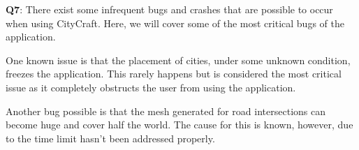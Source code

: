 \textbf{Q7}:
There exist some infrequent bugs and crashes that are possible to occur when using CityCraft.
Here, we will cover some of the most critical bugs of the application.

One known issue is that the placement of cities, under some unknown condition, freezes the application.
This rarely happens but is considered the most critical issue as it completely obstructs the user from using the application.

Another bug possible is that the mesh generated for road intersections can become huge and cover half the world.
The cause for this is known, however, due to the time limit hasn't been addressed properly.


